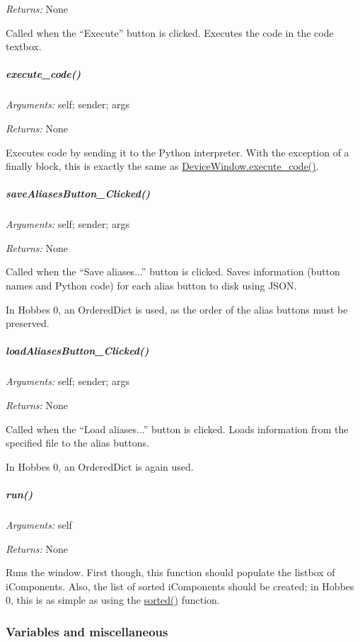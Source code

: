 \documentclass[12pt,letterpaper]{article}
\begin{document}
\emph{Returns:} None

Called when the ``Execute'' button is clicked. Executes the code in the code textbox.



%
%
\subparagraph{execute\_code()}
\label{4.5.1.1.7}

\emph{Arguments:} self; sender; args

\emph{Returns:} None

Executes code by sending it to the Python interpreter. With the exception of a finally block, this is exactly the same as \hyperref[4.3.1.3.17]{DeviceWindow.execute\_code()}.



%
%
\subparagraph{saveAliasesButton\_Clicked()}
\label{4.5.1.1.8}

\emph{Arguments:} self; sender; args

\emph{Returns:} None

Called when the ``Save aliases...'' button is clicked. Saves information (button names and Python code) for each alias button to disk using JSON.

In Hobbes 0, an OrderedDict is used, as the order of the alias buttons must be preserved.



%
%
\subparagraph{loadAliasesButton\_Clicked()}
\label{4.5.1.1.9}

\emph{Arguments:} self; sender; args

\emph{Returns:} None

Called when the ``Load aliases...'' button is clicked. Loads information from the specified file to the alias buttons.

In Hobbes 0, an OrderedDict is again used.



%
%
\subparagraph{run()}
\label{4.5.1.1.10}

\emph{Arguments:} self

\emph{Returns:} None

Runs the window. First though, this function should populate the listbox of iComponents. Also, the list of sorted iComponents should be created; in Hobbes 0, this is as simple as using the \href{http://docs.python.org/library/functions.html#sorted}{sorted()} function.



%
%
\subsubsection{Variables and miscellaneous}
\label{4.5.2}
\end{document}
